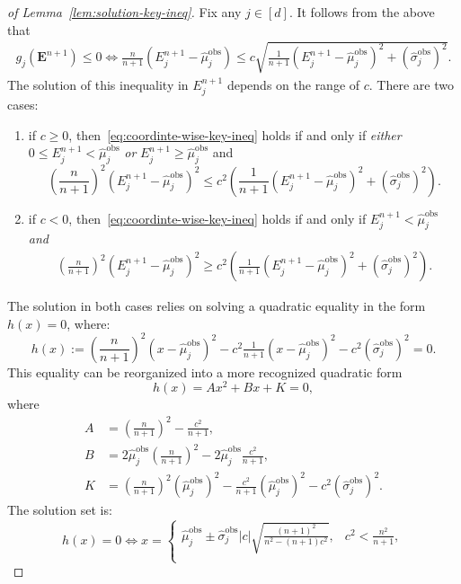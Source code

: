 \begin{proof}[of Lemma~\ref{lem:solution-key-ineq}]
Fix any $j\in [d]$. It follows from the above that
\begin{align}
    g_j(\mathbf{E}^{n+1}) \leq 0 \iff \frac{n}{n+1}\left(E^{n+1}_j-\hat{\mu}^\mathrm{obs}_j\right) \leq c\sqrt{\frac{1}{n+1}\left(E^{n+1}_j-\hat{\mu}^\mathrm{obs}_j\right)^2+(\hat{\sigma}^\mathrm{obs}_j)^2}.
    \label{eq:coordinte-wise-key-ineq}
\end{align}
The solution of this inequality in $E^{n+1}_j$ depends on the range of $c$. There are two cases:
\begin{enumerate}
\item if $c \geq 0$, then~\eqref{eq:coordinte-wise-key-ineq} holds if and only if \emph{either} $0\leq E^{n+1}_j < \hat{\mu}^\mathrm{obs}_j$ \emph{or} $E^{n+1}_j \geq \hat{\mu}^\mathrm{obs}_j$ and
    \[
    \left(\frac{n}{n+1}\right)^2\left(E^{n+1}_j-\hat{\mu}^\mathrm{obs}_j\right)^2 \leq c^2\left(\frac{1}{n+1}(E^{n+1}_j-\hat{\mu}^\mathrm{obs}_j)^2 + (\hat{\sigma}^\mathrm{obs}_j)^2\right).
    \]
\item if $c < 0$, then~\eqref{eq:coordinte-wise-key-ineq} holds if and only if $E^{n+1}_j <  \hat{\mu}^\mathrm{obs}_j$ \emph{and}
    \begin{align*}
        \left(\frac{n}{n+1}\right)^2\left(E^{n+1}_j-\hat{\mu}^\mathrm{obs}_j\right)^2 \geq c^2\left(\tfrac{1}{n+1}\left(E^{n+1}_j-\hat{\mu}^\mathrm{obs}_j\right)^2 + (\hat{\sigma}^\mathrm{obs}_j)^2\right).
    \end{align*}
  \end{enumerate}
  The solution in both cases relies on solving a quadratic equality in the form $h(x) = 0$, where:
\[
h(x):=\left(\frac{n}{n+1}\right)^2\left(x-\hat{\mu}^\mathrm{obs}_j\right)^2 - c^2\tfrac{1}{n+1}\left(x-\hat{\mu}^\mathrm{obs}_j\right)^2 - c^2(\hat{\sigma}^\mathrm{obs}_j)^2 = 0.
\]
This equality can be reorganized into a more recognized quadratic form 
\[
h(x)= Ax^2+Bx +K = 0,
\]
where
\begin{align*}
 A & = \left(\frac{n}{n+1}\right)^2 - \frac{c^2}{n+1}, \\
 B & = 2\hat{\mu}^\mathrm{obs}_j\left(\frac{n}{n+1}\right)^2-2\hat{\mu}^\mathrm{obs}_j \frac{c^2}{n+1}, \\
 K & = \left(\frac{n}{n+1}\right)^2(\hat{\mu}^\mathrm{obs}_j)^2-\frac{c^2}{n+1}(\hat{\mu}^\mathrm{obs}_j)^2-c^2(\hat{\sigma}^\mathrm{obs}_j)^2.
\end{align*}
The solution set is:
\[h(x) = 0 \iff x=
\begin{cases}
    \hat{\mu}^\mathrm{obs}_j \pm \hat{\sigma}^\mathrm{obs}_j|c|\sqrt{\tfrac{(n+1)^2}{n^2-(n+1)c^2}}, & c^2 < \tfrac{n^2}{n+1},\\

\end{cases}\]
\end{proof}
